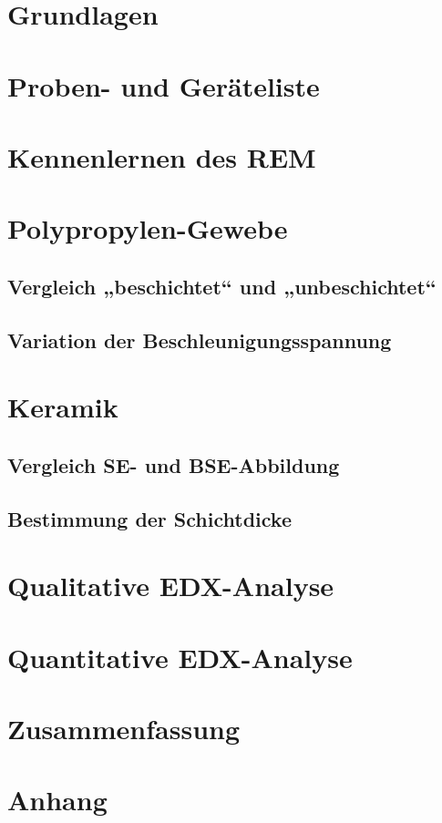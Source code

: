 \documentclass[12pt,english,ngerman]{scrartcl}
\begin{document}
\section{Grundlagen}



\section{Proben- und Geräteliste}


\section{Kennenlernen des REM}


\section{Polypropylen-Gewebe}


\subsection{Vergleich „beschichtet“ und „unbeschichtet“}


\subsection{Variation der Beschleunigungsspannung}


\section{Keramik}


\subsection{Vergleich SE- und BSE-Abbildung}


\subsection{Bestimmung der Schichtdicke}


\section{Qualitative EDX-Analyse}


\section{Quantitative EDX-Analyse}


\section{Zusammenfassung}


\section{Anhang}





\newpage

\printbibliography
\end{document}
